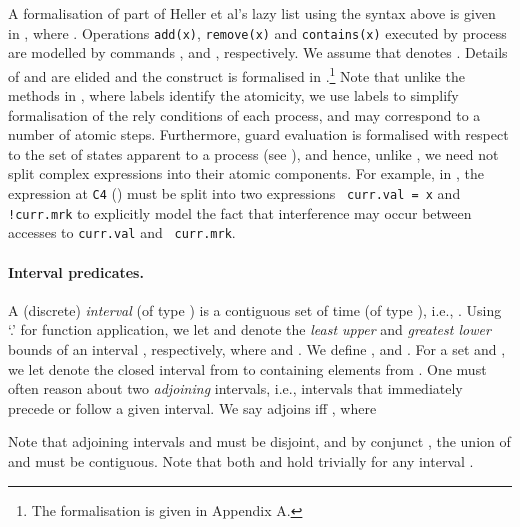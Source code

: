 \documentclass{article}
\theoremstyle{plain}
\theoremstyle{definition}
\begin{document}
A formalisation of part of Heller et al's lazy list using the syntax
above is given in , where . Operations {\tt add(x)}, {\tt remove(x)} and {\tt contains(x)}
executed by process  are modelled by commands ,
 and , respectively. We
assume that  denotes . Details of  and
 are elided and the  construct is
formalised in .\footnote{The
  formalisation is given in Appendix A.}  Note that unlike the methods
in \cite{CGLM06,DSW11}, where labels identify the atomicity, we use
labels to simplify formalisation of the rely conditions of each
process, and may correspond to a number of atomic steps.
Furthermore, guard evaluation is formalised with respect to the set of states
apparent to a process (see ), and hence,
unlike \cite{VHHS06,CGLM06,DSW11}, we need not split complex
expressions into their atomic components. For example, in \cite{VHHS06,CGLM06,DSW11}, the expression at {\tt C4}
() must be split into two expressions {\tt
  curr.val = x} and {\tt !curr.mrk} to explicitly model the fact that
interference may occur between accesses to {\tt curr.val} and {\tt
  curr.mrk}. 

























\paragraph{Interval predicates.}
\label{sec:interval-predicates}
A (discrete) {\em interval} (of type ) is a contiguous set of
time (of type ), i.e., .  Using `.' for function application, we
let  and  denote the \emph{least upper} and
\emph{greatest lower} bounds of an interval , respectively,
where  and . We define ,  and .  For a set  and , we let  denote the closed interval from  to
 containing elements from .  One must often reason about two
\emph{adjoining} intervals, i.e., intervals that immediately precede
or follow a given interval. We say  adjoins  iff
, where 

\noindent
Note that adjoining intervals  and  must be disjoint,
and by conjunct , the union of 
and  must be contiguous. Note that both  and  hold trivially for any
interval .
\end{document}
